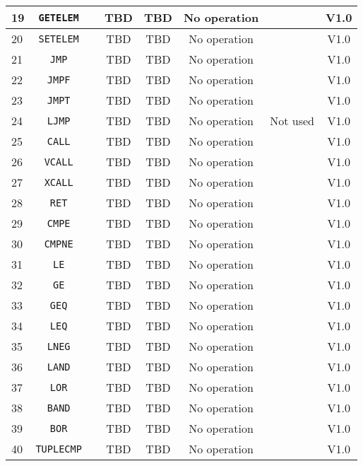 \documentclass{article}
\begin{document}
\begin{longtable}{|l|c|c|c|c|c|c|c|}
		19 & \texttt{GETELEM} & & TBD & TBD & No operation & & \textsf{V1.0} \\ \hline
		20 & \texttt{SETELEM} & & TBD & TBD & No operation & & \textsf{V1.0} \\ \hline
		21 & \texttt{JMP} & & TBD & TBD & No operation & & \textsf{V1.0} \\ \hline
		22 & \texttt{JMPF} & & TBD & TBD & No operation & & \textsf{V1.0} \\ \hline
		23 & \texttt{JMPT} & & TBD & TBD & No operation & & \textsf{V1.0} \\ \hline
		24 & \texttt{LJMP} & & TBD & TBD & No operation & Not used & \textsf{V1.0} \\ \hline
		25 & \texttt{CALL} & & TBD & TBD & No operation & & \textsf{V1.0} \\ \hline
		26 & \texttt{VCALL} & & TBD & TBD & No operation & & \textsf{V1.0} \\ \hline
		27 & \texttt{XCALL} & & TBD & TBD & No operation & & \textsf{V1.0} \\ \hline
		28 & \texttt{RET} & & TBD & TBD & No operation & & \textsf{V1.0} \\ \hline
		29 & \texttt{CMPE} & & TBD & TBD & No operation & & \textsf{V1.0} \\ \hline
		30 & \texttt{CMPNE} & & TBD & TBD & No operation & & \textsf{V1.0} \\ \hline
		31 & \texttt{LE} & & TBD & TBD & No operation & & \textsf{V1.0} \\ \hline
		32 & \texttt{GE} & & TBD & TBD & No operation & & \textsf{V1.0} \\ \hline
		33 & \texttt{GEQ} & & TBD & TBD & No operation & & \textsf{V1.0} \\ \hline
		34 & \texttt{LEQ} & & TBD & TBD & No operation & & \textsf{V1.0} \\ \hline
		35 & \texttt{LNEG} & & TBD & TBD & No operation & & \textsf{V1.0} \\ \hline
		36 & \texttt{LAND} & & TBD & TBD & No operation & & \textsf{V1.0} \\ \hline
		37 & \texttt{LOR} & & TBD & TBD & No operation & & \textsf{V1.0} \\ \hline
		38 & \texttt{BAND} & & TBD & TBD & No operation & & \textsf{V1.0} \\ \hline
		39 & \texttt{BOR} & & TBD & TBD & No operation & & \textsf{V1.0} \\ \hline
		40 & \texttt{TUPLECMP} & & TBD & TBD & No operation & & \textsf{V1.0} \\ \hline

\end{longtable}
\end{document}
